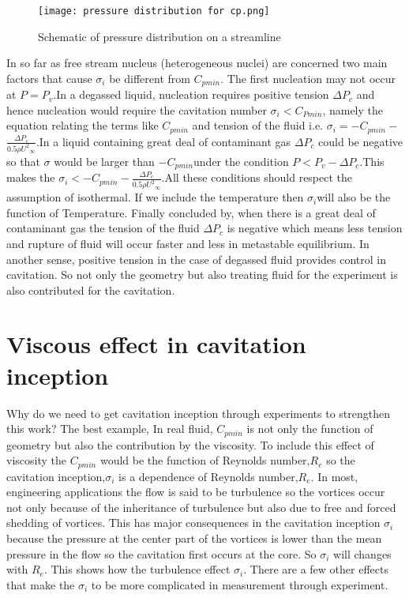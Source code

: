 \begin{figure}[H]
    \centering
    \texttt{[image: pressure distribution for cp.png]}
    \caption{Schematic of pressure distribution on a streamline}
    \label{fig:fig5}
\end{figure}

In so far as free stream nucleus (heterogeneous nuclei) are concerned
two main factors that cause ${\sigma}_i$ be different from $C_{pmin}$.
The first nucleation may not occur at $P=P_v$.In a degassed liquid,
nucleation requires positive tension $\Delta P_c$ and hence nucleation
would require the cavitation number ${{\sigma}_i} <$$C_{Pmin}$, namely
the equation relating the terms like $C_{pmin}$ and tension of the
fluid i.e.  ${{\sigma}_i}=$${-C_{pmin}}-$$\frac {{\Delta}P_c}{0.5 \rho
  {{{U}^2}_\infty}}$.In a liquid containing great deal of contaminant
gas $\Delta P_c$ could be negative so that ${\sigma}$ would be larger
than ${-C_{pmin}}$under the condition $P<{P_v}-$${\Delta}P_c$.This
makes the ${{\sigma}_i}<$${-C_{pmin}}-$$\frac {{\Delta}P_c}{0.5 \rho
  {{{U}^2}_\infty}}$.All these conditions should respect the
assumption of isothermal. If we include the temperature then
${\sigma}_i$will also be the function of Temperature. Finally
concluded by, when there is a great deal of contaminant gas the
tension of the fluid ${\Delta}P_c$ is negative which means less
tension and rupture of fluid will occur faster and less in metastable
equilibrium. In another sense, positive tension in the case of
degassed fluid provides control in cavitation. So not only the
geometry but also treating fluid for the experiment is also
contributed for the cavitation.

\section{Viscous effect in cavitation inception}
Why do we need to get cavitation inception through experiments to
strengthen this work?  The best example, In real fluid, $C_{pmin}$ is
not only the function of geometry but also the contribution by the
viscosity. To include this effect of viscosity the $C_{pmin}$ would be
the function of Reynolds number,$R_e$ so the cavitation
inception,${\sigma}_i$ is a dependence of Reynolds number,$R_e$. In
most, engineering applications the flow is said to be turbulence so
the vortices occur not only because of the inheritance of turbulence
but also due to free and forced shedding of vortices. This has major
consequences in the cavitation inception ${\sigma}_i$ because the
pressure at the center part of the vortices is lower than the mean
pressure in the flow so the cavitation first occurs at the core. So
${\sigma}_i$ will changes with $R_e$. This shows how the turbulence
effect ${\sigma}_i$. There are a few other effects that make the
${\sigma}_i$ to be more complicated in measurement through experiment.

